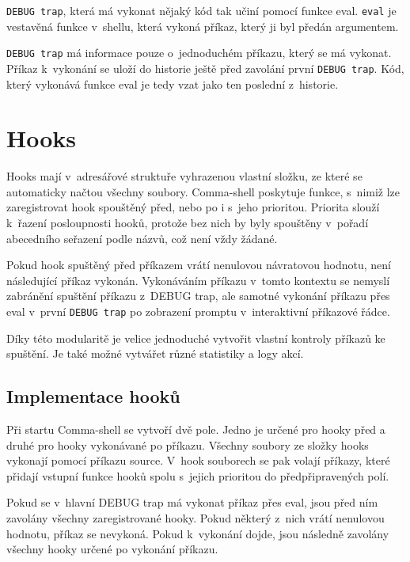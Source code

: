 \documentclass[thesis=M,czech]{FITthesis}[2012/06/26]
\begin{document}
\texttt{DEBUG trap}, která má vykonat nějaký kód tak učiní pomocí funkce eval. \texttt{eval} je vestavěná funkce v~shellu, která vykoná příkaz, který ji byl předán argumentem.

\texttt{DEBUG trap} má informace pouze o~jednoduchém příkazu, který se má vykonat. Příkaz k~vykonání se uloží do historie ještě před zavolání první \texttt{DEBUG trap}. Kód, který vykonává funkce eval je tedy vzat jako ten poslední z~historie.



%
%
%
%
%
\section{Hooks}

Hooks mají v~adresářové struktuře vyhrazenou vlastní složku, ze které se automaticky načtou všechny soubory. Comma-shell poskytuje funkce, s~nimiž lze zaregistrovat hook spouštěný před, nebo po i s~jeho prioritou. Priorita slouží k~řazení posloupnosti hooků, protože bez nich by byly spouštěny v~pořadí abecedního seřazení podle názvů, což není vždy žádané.

Pokud hook spuštěný před příkazem vrátí nenulovou návratovou hodnotu, není následující příkaz vykonán. Vykonáváním příkazu v~tomto kontextu se nemyslí zabránění spuštění příkazu z~DEBUG trap, ale samotné vykonání příkazu přes eval v~první \texttt{DEBUG trap} po zobrazení promptu v~interaktivní příkazové řádce.

Díky této modularitě je velice jednoduché vytvořit vlastní kontroly příkazů ke spuštění. Je také možné vytvářet různé statistiky a logy akcí.


\subsection{Implementace hooků}

Při startu Comma-shell se vytvoří dvě pole. Jedno je určené pro hooky před a druhé pro hooky vykonávané po příkazu. Všechny soubory ze složky hooks vykonají pomocí příkazu source. V~hook souborech se pak volají příkazy, které přidají vstupní funkce hooků spolu s~jejich prioritou do předpřipravených polí.

Pokud se v~hlavní DEBUG trap má vykonat příkaz přes eval, jsou před ním zavolány všechny zaregistrované hooky. Pokud některý z~nich vrátí nenulovou hodnotu, příkaz se nevykoná. Pokud k~vykonání dojde, jsou následně zavolány všechny hooky určené po vykonání příkazu.
\end{document}
